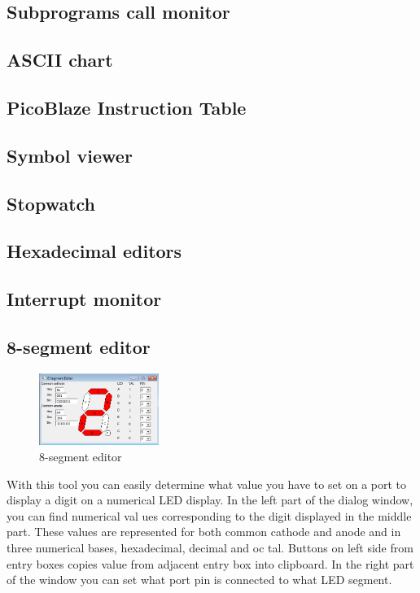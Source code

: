 \subsection{Subprograms call monitor}

\subsection{ASCII chart}

\subsection{PicoBlaze Instruction Table}

\subsection{Symbol viewer}

\subsection{Stopwatch}

\subsection{Hexadecimal editors}

\subsection{Interrupt monitor}

\subsection{8-segment editor}
    \begin{figure}
        \centering{}
        \includegraphics[width=110pt]{img/8segment.png}
        \caption{8-segment editor}
    \end{figure}
    With this tool you can easily determine what value you have to set on a port to display a digit on a numerical LED display. In the left part of the dialog window, you can find numerical val ues corresponding to the digit displayed in the middle part. These values are represented for both common cathode and anode and in three numerical bases, hexadecimal, decimal and oc tal. Buttons on left side from entry boxes copies value from adjacent entry box into clipboard. In the right part of the window you can set what port pin is connected to what LED segment.

